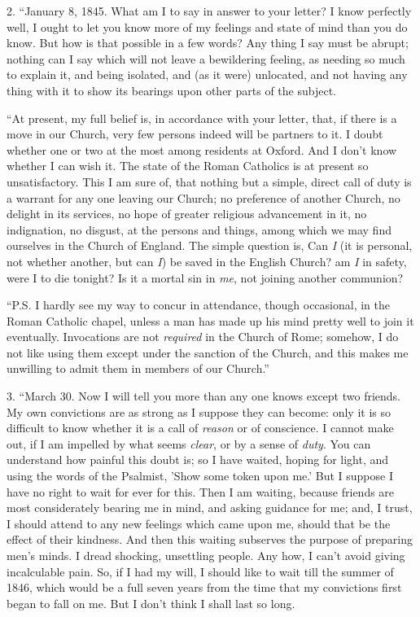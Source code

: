 2. ``January 8, 1845. What am I to say in answer
to your letter? I know perfectly well, I ought to let you know more of
my feelings and state of mind than you do know. But how is that possible
in a few words? Any thing I say must be abrupt; nothing can I say which
will not leave a bewildering feeling, as needing so much to explain it,
and being isolated, and (as it were) unlocated, and not having any thing
with it to show its bearings upon other parts of the subject.

``At present, my full belief is, in accordance with your
letter, that, if there is a move in our Church, very few persons indeed
will be partners to it. I doubt whether one or two at the most among
residents at Oxford. And I don't know whether I can wish it. The state
of the Roman Catholics is at present so unsatisfactory. This I am sure
of, that nothing but a simple, direct call of duty is a warrant for any
one leaving our Church; no preference of another Church, no delight in
its services, no hope of greater religious advancement in it, no
indignation, no disgust, at the persons and things, among which we may
find ourselves in the Church of England. The simple question is, Can \emph{I}
(it is personal, not whether another, but can \emph{I}) be saved in the
English Church? am \emph{I} in safety, were I to die tonight? Is it a
mortal sin in \emph{me}, not joining another communion?

``P.S. I hardly see my way to concur in attendance, though
occasional, in the Roman Catholic chapel, unless a man has made up his
mind pretty well to join it eventually. Invocations are not \emph{required}
in the Church of Rome; somehow, I do not like using them except under
the sanction of the Church, and this makes me unwilling to admit them in
members of our Church.''

3. ``March 30. Now I will tell you more than any one
knows except two friends. My own convictions are as strong as I suppose
they can become: only it is so difficult to know whether it is a call of
\emph{reason} or of conscience. I cannot make out, if I am impelled by
what seems \emph{clear}, or by a sense of \emph{duty}. You can understand how
painful this doubt is; so I have waited, hoping for light, and using the
words of the Psalmist, 'Show some token upon me.' But I suppose I have
no right to wait for ever for this. Then I am waiting, because friends
are most considerately bearing me in mind, and asking guidance for me;
and, I trust, I should attend to any new feelings which came upon me,
should that be the effect of their kindness. And then this waiting
subserves the purpose of preparing men's minds. I dread shocking,
unsettling people. Any how, I can't avoid giving incalculable pain. So,
if I had my will, I should like to wait till the summer of 1846,
which would be a full seven years from the time that my convictions
first began to fall on me. But I don't think I shall last so long.

